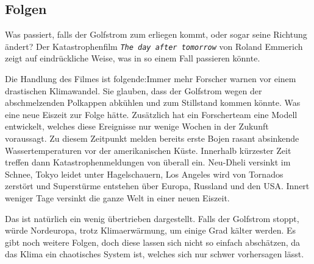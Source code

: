 \subsection{Folgen}

Was passiert, falls der Golfstrom zum erliegen kommt, oder sogar seine Richtung ändert?
Der Katastrophenfilm \texttt{\em The day after tomorrow} von Roland Emmerich zeigt auf eindrückliche Weise, was in so einem Fall passieren könnte. 

Die Handlung des Filmes ist folgende:Immer mehr Forscher warnen vor einem drastischen Klimawandel. Sie glauben, dass der Golfstrom wegen der abschmelzenden Polkappen abkühlen und zum Stillstand kommen könnte. Was eine neue Eiszeit zur Folge hätte. Zusätzlich hat ein Forscherteam eine Modell entwickelt, welches diese Ereignisse nur wenige Wochen in der Zukunft voraussagt. Zu diesem Zeitpunkt melden bereits erste Bojen rasant absinkende Wassertemperaturen vor der amerikanischen Küste. Innerhalb kürzester Zeit treffen dann Katastrophenmeldungen von überall ein. Neu-Dheli versinkt im Schnee, Tokyo leidet unter Hagelschauern, Los Angeles wird von Tornados zerstört und Superstürme entstehen über Europa, Russland und den USA. 
Innert weniger Tage versinkt die ganze Welt in einer neuen Eiszeit. 

Das ist natürlich ein wenig übertrieben dargestellt. Falls der Golfstrom stoppt, würde Nordeuropa, trotz Klimaerwärmung, um einige Grad kälter werden. Es gibt noch weitere Folgen, doch diese lassen sich nicht so einfach abschätzen, da das Klima ein chaotisches System ist, welches sich nur schwer vorhersagen lässt.

